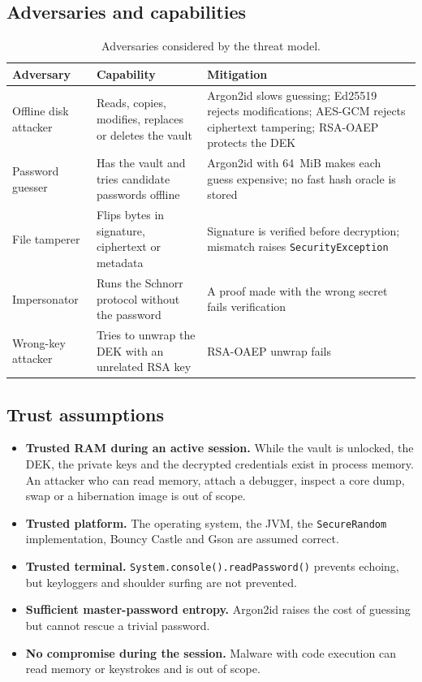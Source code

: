 \documentclass[11pt,a4paper]{article}
\newcommand{\code}[1]{\texttt{#1}}
\begin{document}
\subsection{Adversaries and capabilities}

\begin{table}[htbp]
\centering
\small
\begin{tabular}{@{}p{3.5cm}p{5.2cm}p{5.7cm}@{}}
\toprule
\textbf{Adversary} & \textbf{Capability} & \textbf{Mitigation} \\
\midrule
Offline disk attacker & Reads, copies, modifies, replaces or deletes the vault & Argon2id slows guessing; Ed25519 rejects modifications; AES-GCM rejects ciphertext tampering; RSA-OAEP protects the DEK \\
Password guesser & Has the vault and tries candidate passwords offline & Argon2id with 64~MiB makes each guess expensive; no fast hash oracle is stored \\
File tamperer & Flips bytes in signature, ciphertext or metadata & Signature is verified before decryption; mismatch raises \code{SecurityException} \\
Impersonator & Runs the Schnorr protocol without the password & A proof made with the wrong secret fails verification \\
Wrong-key attacker & Tries to unwrap the DEK with an unrelated RSA key & RSA-OAEP unwrap fails \\
\bottomrule
\end{tabular}
\caption{Adversaries considered by the threat model.}
\label{tab:adversaries}
\end{table}

\subsection{Trust assumptions}

\begin{itemize}[leftmargin=*]
  \item \textbf{Trusted RAM during an active session.} While the vault is
        unlocked, the DEK, the private keys and the decrypted credentials exist
        in process memory. An attacker who can read memory, attach a debugger,
        inspect a core dump, swap or a hibernation image is out of scope.
  \item \textbf{Trusted platform.} The operating system, the JVM, the
        \code{SecureRandom} implementation, Bouncy Castle and Gson are assumed
        correct.
  \item \textbf{Trusted terminal.} \code{System.console().readPassword()}
        prevents echoing, but keyloggers and shoulder surfing are not
        prevented.
  \item \textbf{Sufficient master-password entropy.} Argon2id raises the cost of
        guessing but cannot rescue a trivial password.
  \item \textbf{No compromise during the session.} Malware with code execution
        can read memory or keystrokes and is out of scope.
\end{itemize}
\end{document}
